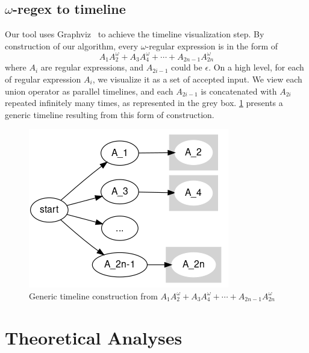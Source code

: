 \documentclass[preprint,12pt]{elsarticle}
\theoremstyle{definition}
\theoremstyle{remark}
\begin{document}
\subsection{$\omega$-regex to timeline} \label{regex2timeline}
Our tool uses Graphviz~\cite{Ellson2001GraphvizO} to achieve the timeline visualization step. By construction of our algorithm, every $\omega$-regular expression is in the form of
\[
    A_1A_2^{\omega} + A_3A_4^{\omega} + \cdots + A_{2n-1}A_{2n}^{\omega}
\]
where $A_i$ are regular expressions, and $A_{2i-1}$ could be $\epsilon$. On a high level, for each of regular expression $A_i$, we visualize it as a set of accepted input. We view each union operator as parallel timelines, and each $A_{2i-1}$ is concatenated with $A_{2i}$ repeated infinitely many times, as represented in the grey box. \cref{fig:timeline} presents a generic timeline resulting from this form of construction.
\begin{figure}[h!]
    \centering
    \includegraphics[scale=0.5]{img/timeline.png}
    \caption{Generic timeline construction from $A_1A_2^{\omega} + A_3A_4^{\omega} + \cdots + A_{2n-1}A_{2n}^{\omega}$}
    \label{fig:timeline}
\end{figure}

\section{Theoretical Analyses}
\end{document}
